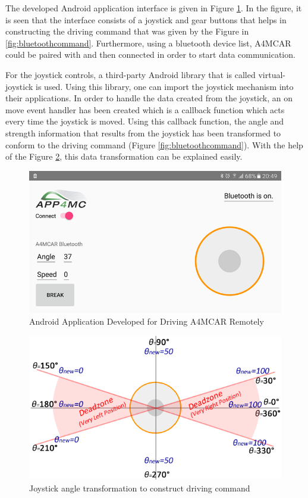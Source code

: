 The developed Android application interface is given in Figure \ref{fig:androidapp}. In the figure, it is seen that the interface consists of a joystick and gear buttons that helps in constructing the driving command that was given by the Figure in \ref{fig:bluetoothcommand}. Furthermore, using a bluetooth device list, A4MCAR could be paired with and then connected in order to start data communication.

For the joystick controls, a third-party Android library that is called virtual-joystick \cite{virtualjoystick} is used. Using this library, one can import the joystick mechanism into their applications. In order to handle the data created from the joystick, an on move event handler has been created which is a callback function which acts every time the joystick is moved. Using this callback function, the angle and strength information that results from the joystick has been transformed to conform to the driving command (Figure \ref{fig:bluetoothcommand}). With the help of the Figure \ref{fig:joystickpie}, this data transformation can be explained easily.
\begin{figure}[!ht]
	\centering
	\includegraphics[scale=0.5]{content/images/androidapp.png}
	\caption{Android Application Developed for Driving A4MCAR Remotely}
	\label{fig:androidapp}
\end{figure}
\begin{figure}[!ht]
	\centering
	\includegraphics[scale=0.5]{content/images/joystickpie.png}
	\caption{Joystick angle transformation to construct driving command}
	\label{fig:joystickpie}
\end{figure}

